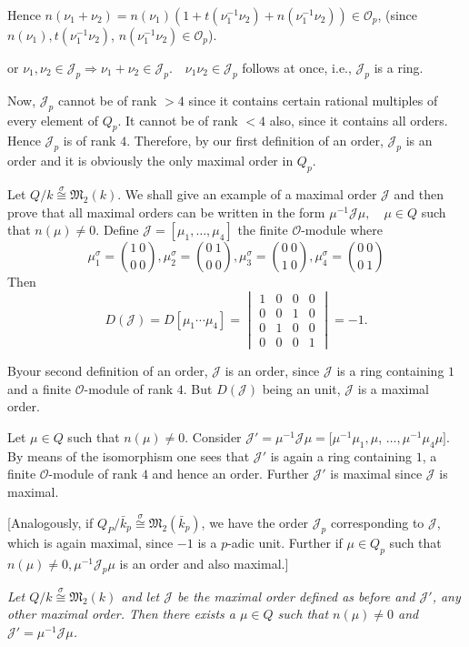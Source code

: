     Hence 
    $n(\nu_1 + \nu_2) = n(\nu_1) (1 + t(\nu^{-1}_1 \nu_2) + n(\nu^{-1}_1
    \nu_2) ) \in \mathscr{O}_p$,  (since  $n(\nu_1), t(\nu^{-1}_1
    \nu_2)$, $n(\nu^{-1}_1\nu_2) \in \mathscr{O}_p$). 
    
    \noindent or $\nu_1,  \nu_2 \in \mathcal{J}_p \Rightarrow \nu_1 + \nu_2 \in
    \mathcal{J}_p.  \quad \nu_1 \nu_2 \in \mathcal{J}_p$ follows at once,
    i.e., $\mathcal{J}_p$ is a ring. 

 Now, $\mathcal{J}_p$ cannot be of rank $>  4$ since it contains
 certain rational multiples of every element of $Q_p$. It cannot be of
 rank $< 4$ also, since it contains all orders. Hence $\mathcal{J}_p$
 is of rank $4$. Therefore, by our first definition of an order,
 $\mathcal{J}_p$ is an order and it is obviously the only maximal
 order in $Q_p$.
 
 Let $Q/k\overset{\sigma}{\cong} \mathfrak{M}_2 (k)$. We shall give an
 example of a maximal order $\mathcal{J}$ and then prove that all
 maximal orders can be written in the form $\mu^{-1} \mathcal{J} \mu,
 \quad \mu \in Q$ such that $n(\mu) \neq 0 $. Define $\mathcal{J} =
       [\mu_1, \ldots,  \mu_4]$ the finite $\mathscr{O}$-module where 
 $$
 \mu^\sigma_1 = \binom{1 ~ 0}{0 ~ 0},
 \mu^\sigma_2 = \binom{0 ~ 1}{0 ~ 0},
 \mu^\sigma_3 = \binom{0 ~ 0}{1 ~ 0},
 \mu^\sigma_4 = \binom{0 ~ 0}{0 ~ 1}
 $$
 Then
 $$
 D(\mathcal{J}) = D[\mu_1 \cdots \mu_4] = 
 \begin{vmatrix} 
   1 & 0 & 0 & 0\\ 
   0 & 0 & 1 & 0\\ 
   0 & 1 & 0 & 0\\ 
   0 & 0 & 0 & 1 
 \end{vmatrix} = -1. 
 $$
 
 By\pageoriginale our second definition of an order, $\mathcal{J}$ is an order,
 since $\mathcal{J}$ is a ring containing $1$ and a finite
 $\mathscr{O}$-module of rank $4$. But $D(\mathcal{J})$ being an unit,
 $\mathcal{J}$ is a maximal order. 
 
 Let $\mu \in Q$ such that $n(\mu) \neq 0$. Consider $\mathcal{J}' =
 \mu^{-1} \mathcal{J} \mu = [\mu^{-1} \mu_1, \mu$, $\ldots,  \mu^{-1} \mu_4
   \mu]$. By means of the isomorphism one sees that $\mathcal{J} '$ is
 again a ring containing $1$, a finite $\mathscr{O}$-module of rank
 $4$ and hence an order. Further $\mathcal{J}'$ is maximal since
 $\mathcal{J}$ is maximal. 
 
 [Analogously, if $Q_P / \bar{k}_p \overset{\sigma}{\cong}
   \mathfrak{M}_2 (\bar{k}_p)$, we have the order $\mathcal{J}_p$
   corresponding to $\mathcal{J}$, which is again maximal, since $-1$
   is a $p$-adic unit. Further if $\mu \in Q_p$ such that $n(\mu) \neq
   0, \mu^{-1} \mathcal{J}_p \mu$ is an order and also maximal.] 
 \begin{theorem}\label{chap1:sec2:thm5} %
   {\em Let $Q/k \overset{\sigma}{\cong} \mathfrak{M}_2 (k)$ and let
     $\mathcal{J}$ be the maximal order defined as before and
     $\mathcal{J}'$, any other maximal order. Then there exists a $\mu
     \in Q$ such that $n(\mu) \neq 0$ and $\mathcal{J}' =
     \mu^{-1}\mathcal{J}\mu$.} 
 \end{theorem} 

